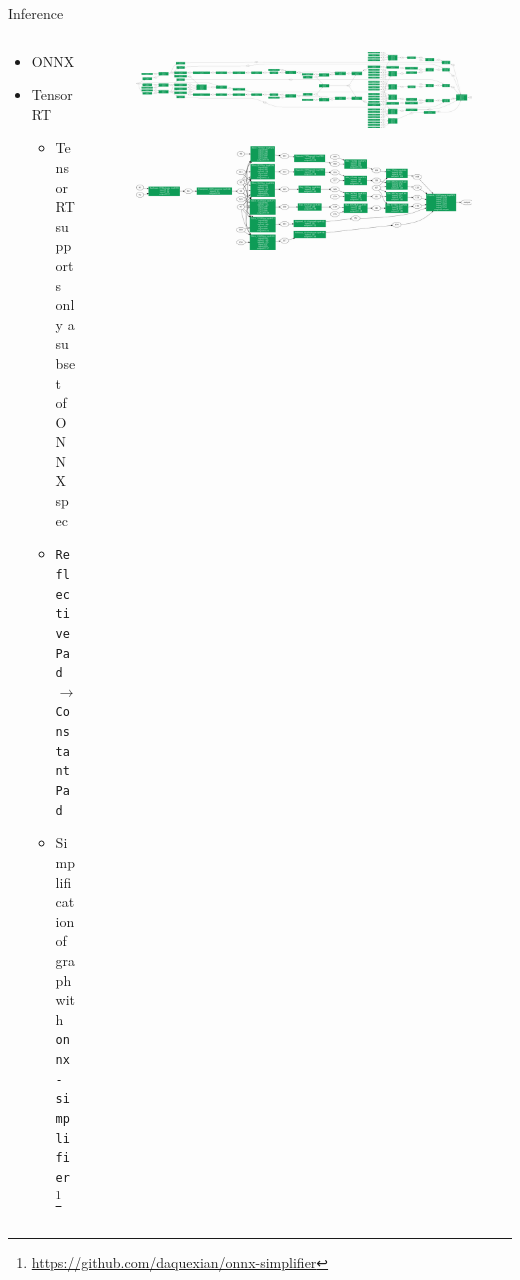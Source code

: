 \documentclass[en]{sdqbeamer}
\begin{document}
\begin{frame}{Inference}
  \begin{columns}
    \begin{column}{0.4\textwidth}
      \begin{itemize}
        \item ONNX
        \item TensorRT
        \begin{itemize}
          \item TensorRT supports only a subset of ONNX spec
          \item \texttt{ReflectivePad} $\rightarrow{}$ \texttt{ConstantPad}
          \item Simplification of graph with \texttt{onnx-simplifier}\footnote{\url{https://github.com/daquexian/onnx-simplifier}}
        \end{itemize}
      \end{itemize}
    \end{column}
    \begin{column}{0.6\textwidth}
      \begin{figure}
        \includegraphics[width=\columnwidth]{complex_graph.png}
        \includegraphics[width=\columnwidth]{simplified_graph.png}
      \end{figure}
    \end{column}
  \end{columns}
\end{frame}
\end{document}
